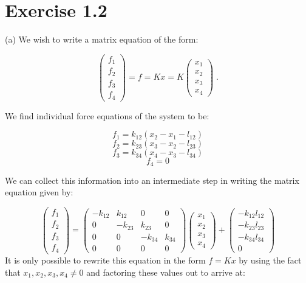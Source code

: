\documentclass[11pt]{article}
\begin{document}
\section*{Exercise 1.2}

(a) We wish to write a matrix equation of the form:

$$\begin{pmatrix} f_1 \\ f_2 \\ f_3 \\ f_4 \end{pmatrix} = f = Kx = K\begin{pmatrix}x_1 \\ x_2 \\ x_3 \\x_4 \end{pmatrix} \;.$$

We find individual force equations of the system to be:

$$f_1 = k_{12}(x_2 - x_1 - l_{12})$$
$$f_2 = k_{23}(x_3 - x_2 - l_{23})$$
$$f_3 = k_{34}(x_4 - x_3 - l_{34})$$
$$f_4 = 0$$

We can collect this information into an intermediate step in writing the matrix equation given by:

$$\begin{pmatrix} f_1 \\ f_2 \\ f_3 \\ f_4
\end{pmatrix} =
\begin{pmatrix}
-k_{12} & k_{12} & 0 & 0 \\ 0 & -k_{23} & k_{23} & 0 \\
0 & 0 & -k_{34} & k_{34} \\ 0 & 0 & 0 & 0
\end{pmatrix}
\begin{pmatrix} x_1 \\ x_2 \\ x_3 \\x_4
\end{pmatrix}
 + \begin{pmatrix} -k_{12}l_{12} \\ -k_{23}l_{23} \\ -k_{34}l_{34} \\ 0 \end{pmatrix}
$$
It is only possible to rewrite this equation in the form $f = Kx$ by using the fact that $x_1,x_2,x_3,x_4 \neq 0$ and factoring these values out to arrive at:
\end{document}
